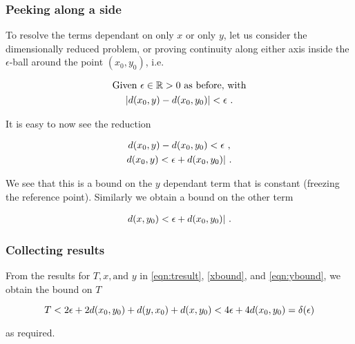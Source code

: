 \begin{frame}
    \frametitle{Peeking along a side}

    To resolve the terms dependant on only \(x\) or only \(y\), let us consider
    the dimensionally reduced problem, or proving continuity along either axis
    inside the \(\epsilon\)-ball around the point \((x_0, y_0)\), i.e.

    \begin{gather*}
        \text{Given } \epsilon \in \mathbb{R} > 0 \text{ as before, with} \\
        |d(x_0, y) - d(x_0, y_0)| < \epsilon~.
    \end{gather*}

    \pause

    It is easy to now see the reduction

    \begin{gather}
        d(x_0, y) - d(x_0, y_0) < \epsilon~, \nonumber \\
        d(x_0, y) < \epsilon + d(x_0, y_0)|~.
        \label{eqn:ybound}
    \end{gather}

    We see that this is a bound on the \(y\) dependant term that is constant
    (freezing the reference point). Similarly we obtain a bound on the other
    term

    \begin{gather}
        d(x, y_0) < \epsilon + d(x_0, y_0)|~.
        \label{eqn:xbound}
    \end{gather}

\end{frame}

\begin{frame}
    \frametitle{Collecting results}

    From the results for \(T, x, \text{and } y\) in \autoref{eqn:tresult},
    \autoref{xbound}, and \autoref{eqn:ybound}, we obtain the bound on \(T\)

    \begin{equation}
        T < 2\epsilon + 2d(x_0, y_0) + d(y, x_0)+ d(x, y_0) < 4\epsilon + 4d(x_0, y_0) = \delta(\epsilon)
    \end{equation}

    as required.

\end{frame}